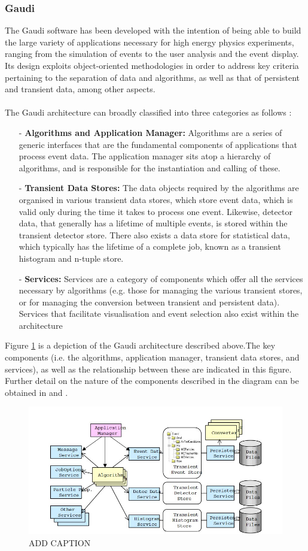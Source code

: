 \subsubsection{Gaudi}
The Gaudi software has been developed with the intention of being able to build the large variety of applications necessary for high energy physics experiments, ranging from the simulation of events to the user analysis and the event display. Its design exploits object-oriented methodologies in order to address key criteria pertaining to the separation of data and algorithms, as well as that of persistent and transient data, among other aspects. \\
\\
The Gaudi architecture can broadly classified into three categories as follows \cite{BARRAND200145}:
\begin{itemize}
\item[-] \textbf{Algorithms and Application Manager:} Algorithms are a series of generic interfaces that are the fundamental components of applications that process event data. The application manager sits atop a hierarchy of algorithms, and is responsible for the instantiation and calling of these.
\item[-]\textbf{Transient Data Stores:} The data objects required by the algorithms are organised in various transient data stores, which store event data, which is valid only during the time it takes to process one event. Likewise, detector data, that generally has a lifetime of multiple events, is stored within the transient detector store. There also exists a data store for statistical data, which typically has the lifetime of a complete job, known as a transient histogram and n-tuple store. 
\item[-] \textbf{Services:} Services are a category of components which offer all the services necessary by algorithms (e.g. those for managing the various transient stores, or for managing the conversion between transient and persistent data). Services that facilitate visualisation and event selection also exist within the architecture
\end{itemize}
Figure \ref{GaudiArchitecture} is a depiction of the Gaudi architecture described above.The key components (i.e. the algorithms, application manager, transient data stores, and services), as well as the relationship between these are indicated in this figure. Further detail on the nature of the components described in the diagram can be obtained in \cite{BARRAND200145} and \cite{Clemencic:2010zz}.
\begin{figure}[H]
    \centering 
    \includegraphics[scale=0.8]{GaudiArchitecture.jpg}
    \caption{ADD CAPTION}
    \label{GaudiArchitecture}
\end{figure}



